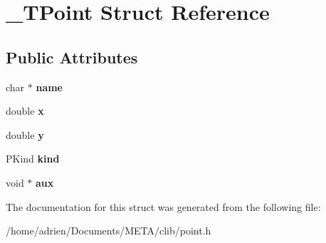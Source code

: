\hypertarget{struct__TPoint}{}\section{\+\_\+\+T\+Point Struct Reference}
\label{struct__TPoint}
\subsection*{Public Attributes}
\begin{DoxyCompactItemize}
\item 
\mbox{\label{struct__TPoint_a4a879ce2b1a756c5782f2e6ad87983c1}} 
char $\ast$ {\bfseries name}
\item 
\mbox{\label{struct__TPoint_a903276509b220c883d8352f422e0265c}} 
double {\bfseries x}
\item 
\mbox{\label{struct__TPoint_a6d42ec995efd7360d0ae2e03419ee5f1}} 
double {\bfseries y}
\item 
\mbox{\label{struct__TPoint_a4ed761a5a45265cccf2184ebb6566a3f}} 
P\+Kind {\bfseries kind}
\item 
\mbox{\label{struct__TPoint_a197c8fbc5e4b23c3778b133f0770ad62}} 
void $\ast$ {\bfseries aux}
\end{DoxyCompactItemize}


The documentation for this struct was generated from the following file\+:\begin{DoxyCompactItemize}
\item 
/home/adrien/\+Documents/\+M\+E\+T\+A/clib/point.\+h\end{DoxyCompactItemize}
